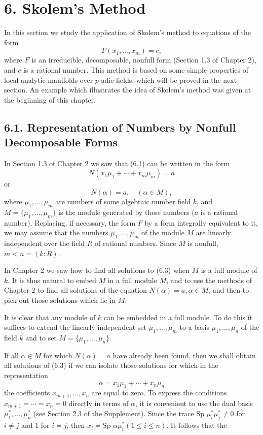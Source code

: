 \documentclass{article}
\begin{document}
\section*{6. Skolem's Method}
In this section we study the application of Skolem's method to equations of the form
\begin{equation}
F(x_1, \ldots, x_m) = c,
\end{equation}
where $F$ is an irreducible, decomposable, nonfull form (Section 1.3 of Chapter 2), and $c$ is a rational number. This method is based on some simple properties of local analytic manifolds over $p$-adic fields, which will be proved in the next section. An example which illustrates the idea of Skolem's method was given at the beginning of this chapter.

\subsection*{6.1. Representation of Numbers by Nonfull Decomposable Forms}
In Section 1.3 of Chapter 2 we saw that (6.1) can be written in the form
\begin{equation}
N(x_1\mu_1 + \cdots + x_m\mu_m) = a
\end{equation}
or
\begin{equation}
N(\alpha) = a, \quad (\alpha \in M),
\end{equation}
where $\mu_1, \ldots, \mu_m$ are numbers of some algebraic number field $k$, and $M = \{\mu_1, \ldots, \mu_m\}$ is the module generated by these numbers ($a$ is a rational number). Replacing, if necessary, the form $F$ by a form integrally equivalent to it, we may assume that the numbers $\mu_1, \ldots, \mu_m$ of the module $M$ are linearly independent over the field $R$ of rational numbers. Since $M$ is nonfull, $m < n = (k : R)$.

In Chapter 2 we saw how to find all solutions to (6.3) when $M$ is a full module of $k$. It is thus natural to embed $M$ in a full module $M$, and to use the methods of Chapter 2 to find all solutions of the equation $N(\alpha) = a, \alpha \in M$, and then to pick out those solutions which lie in $M$.

It is clear that any module of $k$ can be embedded in a full module. To do this it suffices to extend the linearly independent set $\mu_1, \ldots, \mu_m$ to a basis $\mu_1, \ldots, \mu_n$ of the field $k$ and to set $M = \{\mu_1, \ldots, \mu_n\}$.

If all $\alpha \in M$ for which $N(\alpha) = a$ have already been found, then we shall obtain all solutions of (6.3) if we can isolate those solutions for which in the representation
\begin{equation}
\alpha = x_1\mu_1 + \cdots + x_n\mu_n
\end{equation}
the coefficients $x_{m+1}, \ldots, x_n$ are equal to zero. To express the conditions $x_{m+1} = \cdots = x_n = 0$ directly in terms of $\alpha$, it is convenient to use the dual basis $\mu_1^*, \ldots, \mu_n^*$ (see Section 2.3 of the Supplement). Since the trace $\text{Sp }\mu_i^*\mu_j^* \neq 0$ for $i \neq j$ and 1 for $i = j$, then $x_i = \text{Sp }\alpha \mu_i^* (1 \leq i \leq n)$. It follows that the 
\end{document}

